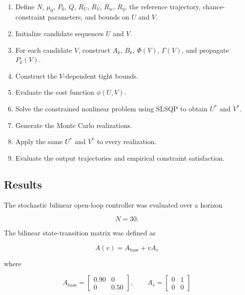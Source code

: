 \begin{enumerate}
    \item Define \(N\), \(\mu_0\), \(P_0\), \(Q\), \(R_U\), \(R_V\),
    \(R_w\), \(R_\eta\), the reference trajectory, chance-constraint
    parameters, and bounds on \(U\) and \(V\).

    \item Initialize candidate sequences \(U\) and \(V\).

    \item For each candidate \(V\), construct \(A_k\), \(B_k\),
    \(\Phi(V)\), \(\Gamma(V)\), and propagate \(P_k(V)\).

    \item Construct the \(V\)-dependent tight bounds.

    \item Evaluate the cost function \(\phi(U,V)\).

    \item Solve the constrained nonlinear problem using SLSQP to obtain
    \(U^\ast\) and \(V^\ast\).

    \item Generate the Monte Carlo realizations.

    \item Apply the same \(U^\ast\) and \(V^\ast\) to every realization.

    \item Evaluate the output trajectories and empirical constraint
    satisfaction.
\end{enumerate}

\subsection{Results}
\label{subsec:sb_open_loop_results}

The stochastic bilinear open-loop controller was evaluated over a horizon

\begin{equation}
    N=30.
\end{equation}

The bilinear state-transition matrix was defined as

\begin{equation}
    A(v)
    =
    A_{\mathrm{base}}
    +
    vA_v
\end{equation}

where

\begin{equation}
    A_{\mathrm{base}}
    =
    \begin{bmatrix}
        0.90 & 0\\
        0 & 0.50
    \end{bmatrix},
    \qquad
    A_v
    =
    \begin{bmatrix}
        0 & 1\\
        0 & 0
    \end{bmatrix}
\end{equation}

